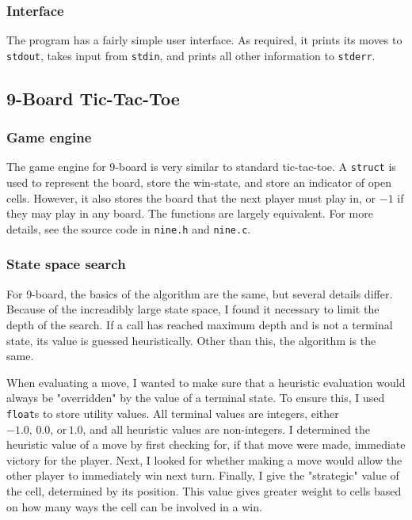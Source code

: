 \documentclass{article}
\begin{document}
\subsubsection{Interface}

The program has a fairly simple user interface. As required, it prints its moves to \texttt{stdout}, takes input from \texttt{stdin}, and prints all other information to \texttt{stderr}.

\subsection{9-Board Tic-Tac-Toe}

\subsubsection{Game engine}
The game engine for 9-board is very similar to standard tic-tac-toe. A \texttt{struct} is used to represent the board, store the win-state, and store an indicator of open cells. However, it also stores the board
that the next player must play in, or $-1$ if they may play in any board. The functions are largely equivalent. For more details, see the source code in \texttt{nine.h} and \texttt{nine.c}.

\subsubsection{State space search}
For 9-board, the basics of the algorithm are the same, but several details differ. Because of the increadibly large state space, I found it necessary to limit the depth of the search. If a call has reached maximum depth
and is not a terminal state, its value is guessed heuristically. Other than this, the algorithm is the same. %

When evaluating a move, I wanted to make sure that a heuristic evaluation would always be "overridden" by the value of a terminal state. To ensure this, I used \texttt{float}s to store utility values.
All terminal values are integers, either $-1.0,\, 0.0,\, \text{or}\, 1.0$, and all heuristic values are non-integers. I determined the heuristic value of a move by first checking for, if that move were made,
immediate victory for the player. Next, I looked for whether making a move would allow the other player to immediately win next turn. Finally, I give the "strategic" value of the cell, determined by its position.
This value gives greater weight to cells based on how many ways the cell can be involved in a win.
\end{document}
